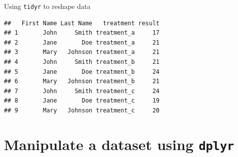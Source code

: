 \documentclass[14pt,ignorenonframetext,]{bredelebeamer}
\newenvironment{Shaded}{\begin{snugshade}}{\end{snugshade}}
\newcommand{\KeywordTok}[1]{\textcolor[rgb]{0.94,0.87,0.69}{#1}}
\newcommand{\DataTypeTok}[1]{\textcolor[rgb]{0.87,0.87,0.75}{#1}}
\newcommand{\DecValTok}[1]{\textcolor[rgb]{0.86,0.86,0.80}{#1}}
\newcommand{\StringTok}[1]{\textcolor[rgb]{0.80,0.58,0.58}{#1}}
\newcommand{\OperatorTok}[1]{\textcolor[rgb]{0.94,0.94,0.82}{#1}}
\newcommand{\NormalTok}[1]{\textcolor[rgb]{0.80,0.80,0.80}{#1}}
\begin{document}
\begin{frame}[fragile]{Using \texttt{tidyr} to reshape data}

\begin{Shaded}
\end{Shaded}

\begin{verbatim}
##   First Name Last Name   treatment result
## 1       John     Smith treatment_a     17
## 2       Jane       Doe treatment_a     21
## 3       Mary   Johnson treatment_a     21
## 4       John     Smith treatment_b     21
## 5       Jane       Doe treatment_b     24
## 6       Mary   Johnson treatment_b     21
## 7       John     Smith treatment_c     24
## 8       Jane       Doe treatment_c     19
## 9       Mary   Johnson treatment_c     20
\end{verbatim}

\end{frame}

\section{\texorpdfstring{Manipulate a dataset using
\texttt{dplyr}}{Manipulate a dataset using dplyr}}\label{manipulate-a-dataset-using-dplyr}
\end{document}
